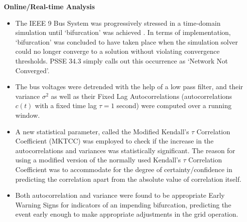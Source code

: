 \clearpage
\noindent\textbf{Online/Real-time Analysis}
\begin{itemize}
	\item The IEEE 9 Bus System was progressively stressed in a time-domain simulation until `bifurcation' was achieved \cite{sanchez01}. In terms of implementation, `bifurcation' was concluded to have taken place when the simulation solver could no longer converge to a solution without violating convergence thresholds. PSSE 34.3 simply calls out this occurrence as `Network Not Converged'.
	\item The bus voltages were detrended with the help of a low pass filter, and their variance $\sigma^2$ as well as their Fixed Lag Autocorrelations (autocorrelations $c(t)$ with a fixed time lag $\tau = 1$ second) were computed over a running window. 
	\item A new statistical parameter, called the Modified Kendall's $\tau$ Correlation Coefficient (MKTCC) was employed to check if the increase in the autocorrelations and variances was statistically significant. The reason for using a modified version of the normally used Kendall's $\tau$ Correlation Coefficient was to accommodate for the degree of certainty/confidence in predicting the correlation apart from the absolute value of correlation itself.
	\item Both autocorrelation and variance were found to be appropriate Early Warning Signs for indicators of an impending bifurcation, predicting the event early enough to make appropriate adjustments in the grid operation. 
\end{itemize}